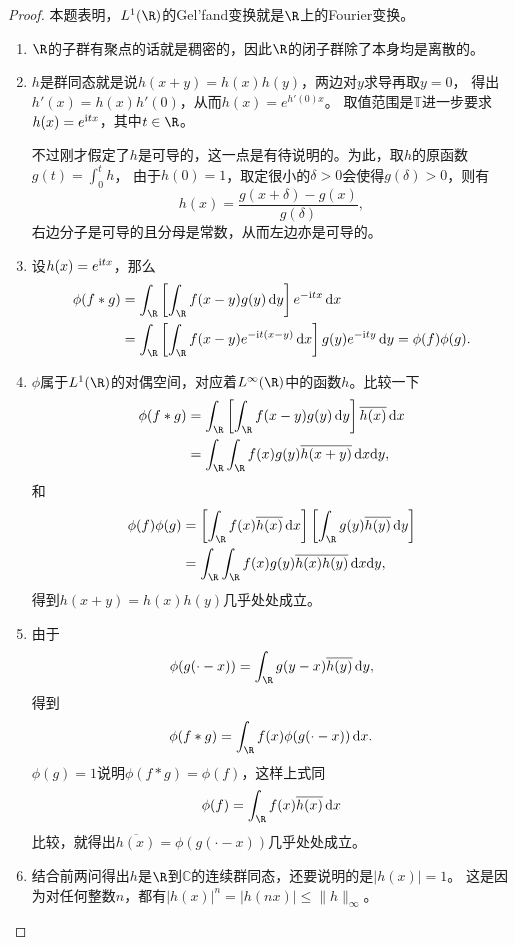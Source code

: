 \begin{proof}
    本题表明，$L^1(\R)$的Gel'fand变换就是$\R$上的Fourier变换。
    \begin{enumerate}[label=(\roman*)]
    \item $\R$的子群有聚点的话就是稠密的，因此$\R$的闭子群除了本身均是离散的。
    \item $h$是群同态就是说$h(x+y)=h(x)h(y)$，两边对$y$求导再取$y=0$，
    得出$h'(x)=h(x)h'(0)$，从而$h(x)=e^{h'(0)x}$。
    取值范围是$\mathbb{T}$进一步要求$h(x)=e^{{\rm i}tx}$，其中$t\in\R$。

    不过刚才假定了$h$是可导的，这一点是有待说明的。为此，取$h$的原函数$g(t)=\int_0^th$，
    由于$h(0)=1$，取定很小的$\delta>0$会使得$g(\delta)>0$，则有
    \[h(x)=\frac{g(x+\delta)-g(x)}{g(\delta)},\]
    右边分子是可导的且分母是常数，从而左边亦是可导的。
    \item 设$h(x)=e^{{\rm i}tx}$，那么
    \begin{align*}
        \phi(f*g)&=\int_\R\left[\int_\R f(x-y)g(y)\,{\rm d}y\right]e^{-{\rm i}tx}\,{\rm d}x\\
        &=\int_\R\left[\int_\R f(x-y)e^{-{\rm i}t(x-y)}\,{\rm d}x\right]g(y)e^{-{\rm i}ty}\,{\rm d}y=\phi(f)\phi(g).
    \end{align*}
    \item $\phi$属于$L^1(\R)$的对偶空间，对应着$L^\infty(\R)$中的函数$h$。比较一下
    \begin{align*}
        \phi(f*g)&=\int_\R\left[\int_\R f(x-y)g(y)\,{\rm d}y\right]\overline{h(x)}\,{\rm d}x\\
        &=\int_\R\int_\R f(x)g(y)\overline{h(x+y)}\,{\rm d}x{\rm d}y,
    \end{align*}
    和
    \begin{align*}
        \phi(f)\phi(g)&=\left[\int_\R f(x)\overline{h(x)}\,{\rm d}x\right]
        \left[\int_\R g(y)\overline{h(y)}\,{\rm d}y\right]\\
        &=\int_\R\int_\R f(x)g(y)\overline{h(x)h(y)}\,{\rm d}x{\rm d}y,
    \end{align*}
    得到$h(x+y)=h(x)h(y)$几乎处处成立。
    \item 由于
    \[\phi(g(\cdot-x))=\int_\R g(y-x)\overline{h(y)}\,{\rm d}y,\]
    得到
    \[\phi(f*g)=\int_\R f(x)\phi(g(\cdot-x))\,{\rm d}x.\]
    $\phi(g)=1$说明$\phi(f*g)=\phi(f)$，这样上式同
    \[\phi(f)=\int_\R f(x)\overline{h(x)}\,{\rm d}x\]
    比较，就得出$\overline{h(x)}=\phi(g(\cdot-x))$几乎处处成立。
    \item 结合前两问得出$h$是$\R$到$\mathbb{C}$的连续群同态，还要说明的是$|h(x)|=1$。
    这是因为对任何整数$n$，都有$|h(x)|^n=|h(nx)|\leqslant\|h\|_\infty$。\qedhere
    \end{enumerate}
\end{proof}
